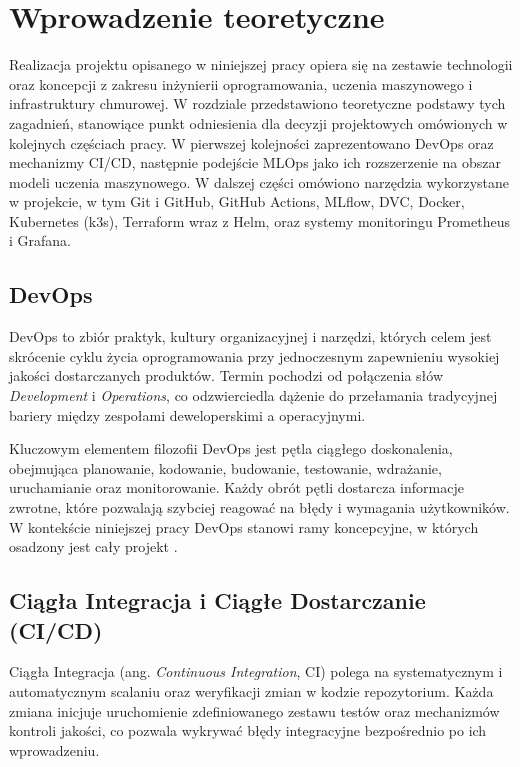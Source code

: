 \section{Wprowadzenie teoretyczne}

Realizacja projektu opisanego w niniejszej pracy opiera się na zestawie technologii oraz koncepcji z zakresu inżynierii oprogramowania, uczenia maszynowego i infrastruktury chmurowej. W rozdziale przedstawiono teoretyczne podstawy tych zagadnień, stanowiące punkt odniesienia dla decyzji projektowych omówionych w kolejnych częściach pracy. W pierwszej kolejności zaprezentowano DevOps oraz mechanizmy CI/CD, następnie podejście MLOps jako ich rozszerzenie na obszar modeli uczenia maszynowego. W dalszej części omówiono narzędzia wykorzystane w projekcie, w tym Git i GitHub, GitHub Actions, MLflow, DVC, Docker, Kubernetes (k3s), Terraform wraz z Helm, oraz systemy monitoringu Prometheus i Grafana.

\subsection{DevOps}

DevOps to zbiór praktyk, kultury organizacyjnej i narzędzi, których celem jest skrócenie cyklu życia oprogramowania przy jednoczesnym zapewnieniu wysokiej jakości dostarczanych produktów. Termin pochodzi od połączenia słów \textit{Development} i \textit{Operations}, co odzwierciedla dążenie do przełamania tradycyjnej bariery między zespołami deweloperskimi a operacyjnymi.

Kluczowym elementem filozofii DevOps jest pętla ciągłego doskonalenia, obejmująca planowanie, kodowanie, budowanie, testowanie, wdrażanie, uruchamianie oraz monitorowanie. Każdy obrót pętli dostarcza informacje zwrotne, które pozwalają szybciej reagować na błędy i wymagania użytkowników. W kontekście niniejszej pracy DevOps stanowi ramy koncepcyjne, w których osadzony jest cały projekt \cite{loukides_devops_bookey}.

\subsection{Ciągła Integracja i Ciągłe Dostarczanie (CI/CD)}

Ciągła Integracja (ang. \textit{Continuous Integration}, CI) polega na systematycznym i automatycznym scalaniu oraz weryfikacji zmian w kodzie repozytorium. Każda zmiana inicjuje uruchomienie zdefiniowanego zestawu testów oraz mechanizmów kontroli jakości, co pozwala wykrywać błędy integracyjne bezpośrednio po ich wprowadzeniu.

